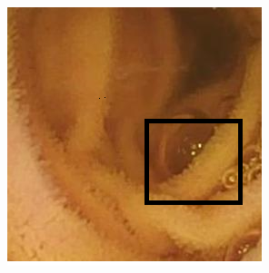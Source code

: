 \documentclass[conference]{IEEEtran}
\begin{document}
\begin{figure}[!t]
        \centering
        \includegraphics[width=\linewidth]{Figures/520/520_box.png}
    

\end{figure}
\end{document}
